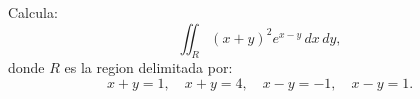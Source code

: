 Calcula:
\[
\iint_R (x+y)^2 e^{x-y} \, dx \, dy,
\]
donde $R$ es la region delimitada por:
\[
x + y = 1, \quad x + y = 4, \quad x - y = -1, \quad x - y = 1.
\]
